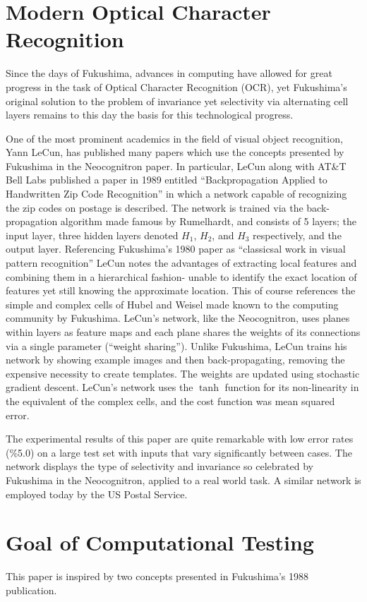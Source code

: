 \documentclass[12pt]{article}
\begin{document}
\section{Modern Optical Character Recognition}
Since the days of Fukushima, advances in computing have allowed for great progress in the task of Optical Character Recognition (OCR), yet Fukushima's original solution to the problem of invariance yet selectivity via alternating cell layers remains to this day the basis for this technological progress.

One of the most prominent academics in the field of visual object recognition, Yann LeCun, has published many papers which use the concepts presented by Fukushima in the Neocognitron paper. In particular, LeCun along with AT\&T Bell Labs published a paper in 1989 entitled ``Backpropagation Applied to Handwritten Zip Code Recognition'' in which a network capable of recognizing the zip codes on postage is described. The network is trained via the back-propagation algorithm made famous by Rumelhardt, and consists of 5 layers; the input layer, three hidden layers denoted $H_1$, $H_2$, and $H_3$ respectively, and the output layer. Referencing Fukushima's 1980 paper as ``classicsal work in visual pattern recognition'' LeCun notes the advantages of extracting local features and combining them in a hierarchical fashion- unable to identify the exact location of features yet still knowing the approximate location. This of course references the simple and complex cells of Hubel and Weisel made known to the computing community by Fukushima. LeCun's network, like the Neocognitron, uses planes within layers as feature maps and each plane shares the weights of its connections via a single parameter (``weight sharing''). Unlike Fukushima, LeCun trains his network by showing example images and then back-propagating, removing the expensive necessity to create templates. The weights are updated using stochastic gradient descent. LeCun's network uses the $\tanh$ function for its non-linearity in the equivalent of the complex cells, and the cost function was mean squared error.  

The experimental results of this paper are quite remarkable with low error rates (\%5.0) on a large test set with inputs that vary significantly between cases. The network displays the type of selectivity and invariance so celebrated by Fukushima in the Neocognitron, applied to a real world task. A similar network is employed today by the US Postal Service. 

\section{Goal of Computational Testing}
This paper is inspired by two concepts presented in Fukushima's 1988 publication. 
\end{document}
